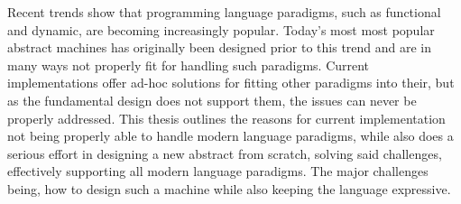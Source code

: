 
Recent trends show that programming language paradigms, such as functional and
dynamic, are becoming increasingly popular. Today's most most popular abstract
machines has originally been designed prior to this trend and are in many ways
not properly fit for handling such paradigms. Current implementations offer
ad-hoc solutions for fitting other paradigms into their, but as the fundamental
design does not support them, the issues can never be properly addressed. This
thesis outlines the reasons for current implementation not being properly able
to handle modern language paradigms, while also does a serious effort in
designing a new abstract from scratch, solving said challenges, effectively
supporting all modern language paradigms. The major challenges being, how to
design such a machine while also keeping the language expressive.

